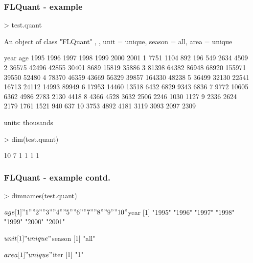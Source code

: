 \documentclass{beamer}%
\begin{document}
\begin{frame}[containsverbatim]

  \frametitle{FLQuant - example}

{\tiny{
\begin{Schunk}
\begin{Sinput}
> test.quant
\end{Sinput}
\begin{Soutput}
An object of class "FLQuant"
, , unit = unique, season = all, area = unique

    year
age  1995   1996   1997   1998   1999   2000   2001  
  1    7751   1104    892    196    549   2634   4509
  2   36575  42496  42855  30401   8689  15819  35886
  3   81398  64382  86948  68920 155971  39550  52480
  4   78370  46359  43669  56329  39857 164330  48238
  5   36499  32130  22541  16713  24112  14993  89949
  6   17953  14460  13518   6432   6829   9343   6836
  7    9772  10605   6362   4986   2783   2130   4418
  8    4366   4528   3632   2506   2246   1030   1127
  9    2336   2624   2179   1761   1521    940    637
  10   3753   4892   4181   3119   3093   2097   2309

units:  thousands 
\end{Soutput}
\begin{Sinput}
> dim(test.quant)
\end{Sinput}
\begin{Soutput}
[1] 10  7  1  1  1  1
\end{Soutput}
\end{Schunk}
}}

\end{frame}
\begin{frame}[containsverbatim]

  \frametitle{FLQuant - example contd.}


{\tiny{
\begin{Schunk}
\begin{Sinput}
> dimnames(test.quant)
\end{Sinput}
\begin{Soutput}
$age
 [1] "1"  "2"  "3"  "4"  "5"  "6"  "7"  "8"  "9"  "10"

$year
[1] "1995" "1996" "1997" "1998" "1999" "2000" "2001"

$unit
[1] "unique"

$season
[1] "all"

$area
[1] "unique"

$iter
[1] "1"
\end{Soutput}
\end{Schunk}
}}

\end{frame}
\end{document}
